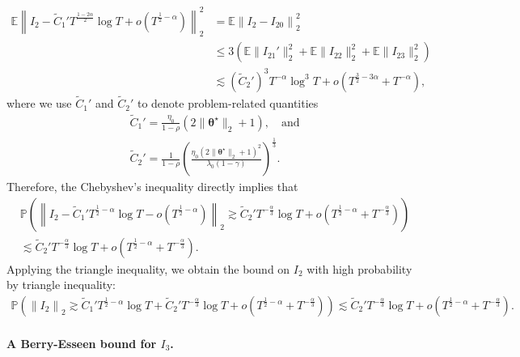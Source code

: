 \begin{align*}
\mathbb{E}\left\|I_2 - \widetilde{C}_1'T^{\frac{1-2\alpha}{2}} \log T + o(T^{\frac{1}{2}-\alpha})\right\|_2^2 
&= \mathbb{E}\left\|I_2 - I_{20}\right\|_2^2 \\ 
&\leq 3\left(\mathbb{E}\|I_{21}'\|_2^2 + \mathbb{E}\|I_{22}\|_2^2 + \mathbb{E}\|I_{23}\|_2^2\right)\\ 
&\lesssim (\widetilde{C}_2')^3 T^{-\alpha}\log^3 T + o(T^{\frac{3}{2}-3\alpha} + T^{-\alpha}),
\end{align*}
where we use $\widetilde{C}_1'$ and $\widetilde{C}_2'$ to denote problem-related quantities
\begin{align}
&\widetilde{C}_1' = \frac{\eta_0}{1-\rho}(2\|\bm{\theta}^\star\|_2+1), \quad \text{and} \label{eq:Berry-Esseen-C10}\\ 
&\widetilde{C}_2' = \frac{1}{1-\rho} \left(\frac{\eta_0(2\|\bm{\theta}^\star\|_2+1)^2}{\lambda_0(1-\gamma)}\right)^{\frac{1}{3}}. \label{eq:Berry-Esseen-C20}
\end{align}
Therefore, the Chebyshev's inequality  directly implies that
\begin{align*}
&\mathbb{P}\left(\left\|I_2 - \widetilde{C}_1'T^{\frac{1}{2}-\alpha}\log T -o(T^{\frac{1}{2}-\alpha}) \right\|_2 \gtrsim \widetilde{C}_2'T^{-\frac{\alpha}{3}}\log T + o(T^{\frac{1}{2}-\alpha} + T^{-\frac{\alpha}{3}})\right)\\
 &\lesssim \widetilde{C}_2'T^{-\frac{\alpha}{3}}\log T + o(T^{\frac{1}{2}-\alpha} + T^{-\frac{\alpha}{3}}).
\end{align*}
Applying the triangle inequality, we obtain the bound on $I_2$ with high probability by triangle inequality:
\begin{align}\label{eq:markov-Berry-Esseen-I2}
\mathbb{P}\left(\left\|I_2 \right\|_2 \gtrsim \widetilde{C}_1'T^{\frac{1}{2}-\alpha}\log T + \widetilde{C}_2'T^{-\frac{\alpha}{3}}\log T + o(T^{\frac{1}{2}-\alpha} + T^{-\frac{\alpha}{3}})\right)
 \lesssim \widetilde{C}_2'T^{-\frac{\alpha}{3}}\log T + o(T^{\frac{1}{2}-\alpha} + T^{-\frac{\alpha}{3}}).
\end{align}

\paragraph{A Berry-Esseen bound for $I_3$.}

